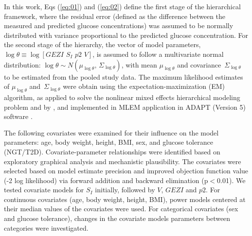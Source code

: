 \documentclass[utf8]{frontiersSCNS} %
\begin{document}
In this work, Eqs (\ref{eq:01}) and (\ref{eq:02}) define the first stage of the hierarchical framework, where the residual error (defined as the difference between the measured and predicted glucose concentrations) was assumed to be normally distributed with variance proportional to the predicted glucose concentration. For the second stage of the hierarchy, the vector of model parameters, $\log \theta  \equiv \log \left[ {GEZI\,\,{S_I}\,\,p2\,\,V} \right]$, is assumed to follow a multivariate normal distribution: $\log \theta  \sim N\left( {{\mu_{\log \theta }},\,{\Sigma _{\log \theta }}} \right)$, with mean   ${\mu _{\log \theta }}$ and covariance   $\,{\Sigma _{\log \theta }}$ to be estimated from the pooled study data. The maximum likelihood estimates of   ${\mu _{\log \theta }}$ and $\,{\Sigma _{\log \theta }}$ were obtain using the expectation-maximization (EM) algorithm, as applied to solve the nonlinear mixed effects hierarchical modeling problem \citet{Schumitzky1995EMAnalysis} and  by \citet{walker_1996}, and implemented in  MLEM application in ADAPT (Version 5) software \citep{AdaptUserGuide}. 

The following covariates were examined for their influence on the model parameters: age, body weight, height, BMI, sex, and glucose tolerance (NGT/T2D). Covariate-parameter relationships were identified based on exploratory graphical analysis and mechanistic plausibility. The covariates were selected based on model estimate precision and improved objection function value (-2 log likelihood) via forward addition and backward elimination (p$<$0.01). We tested covariate models for $S_I$ initially, followed by $V$, $GEZI$ and $p2$. For continuous covariates (age, body weight, height, BMI), power models centered at their median values of the covariates were used. For categorical covariates (sex and glucose tolerance), changes in the covariate models parameters between categories were investigated. 
\end{document}
